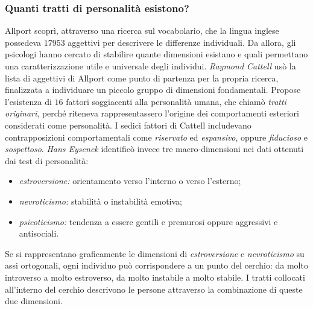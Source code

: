 \documentclass[a4paper]{article}
\begin{document}
\subsubsection{Quanti tratti di personalità esistono?}
Allport scoprì, attraverso una ricerca sul vocabolario, che la lingua inglese possedeva \(17953\) aggettivi per descrivere le differenze individuali. Da allora, gli psicologi hanno cercato di stabilire quante dimensioni esistano e quali permettano una caratterizzazione utile e universale degli individui.
\emph{Raymond Cattell} usò la lista di aggettivi di Allport come punto di partenza per la propria ricerca, finalizzata a individuare un piccolo gruppo di dimensioni fondamentali. Propose l'esistenza di \(16\) fattori soggiacenti alla personalità umana, che chiamò \emph{tratti originari}, perché riteneva rappresentassero l'origine dei comportamenti esteriori considerati come personalità.
I sedici fattori di Cattell includevano contrapposizioni comportamentali come \emph{riservato} ed \emph{espansivo}, oppure \emph{fiducioso} e \emph{sospettoso}.
\emph{Hans Eysenck} identificò invece tre macro-dimensioni nei dati ottenuti dai test di personalità:
\begin{itemize}
    \item \emph{estroversione:} orientamento verso l'interno o verso l'esterno;
    \item \emph{nevroticismo:} stabilità o instabilità emotiva;
    \item \emph{psicoticismo:} tendenza a essere gentili e premurosi oppure aggressivi e antisociali.
\end{itemize}
Se si rappresentano graficamente le dimensioni di \emph{estroversione} e \emph{nevroticismo} su assi ortogonali, ogni individuo può corrispondere a un punto del cerchio: da molto introverso a molto estroverso, da molto instabile a molto stabile. I tratti collocati all'interno del cerchio descrivono le persone attraverso la combinazione di queste due dimensioni.
\end{document}

